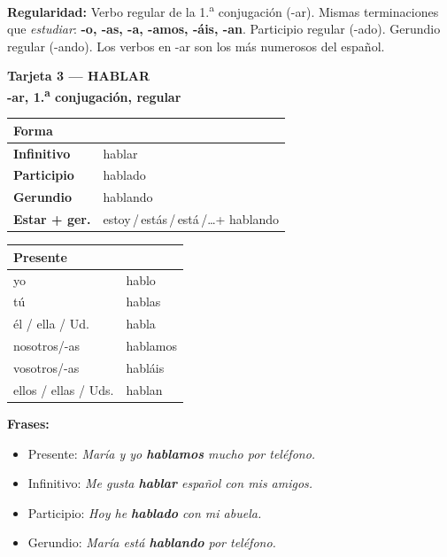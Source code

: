 \documentclass[a4paper,10pt]{article}
\newcommand{\verboheader}[3]{%
  \noindent
  \colorbox{azulverbo!90}{\parbox{\dimexpr\linewidth-2\fboxsep}{%
    \centering\color{white}\bfseries\large Tarjeta #1 --- #2\\[2pt]
    \normalsize #3%
  }}
  \vspace{4pt}
}
\begin{document}
\begin{trucoverbo}
\textbf{Regularidad:} Verbo regular de la 1.\textsuperscript{a} conjugación (-ar). Mismas terminaciones que \textit{estudiar}: \textbf{-o, -as, -a, -amos, -áis, -an}. Participio regular (-ado). Gerundio regular (-ando). Los verbos en -ar son los más numerosos del español.
\end{trucoverbo}

\newpage

\verboheader{3}{HABLAR}{-ar, 1.\textsuperscript{a} conjugación, regular}

\begin{minipage}[t]{0.48\linewidth}
\small
\begin{tabular}{|>{\bfseries}l|l|}
\hline
\rowcolor{azulverbo!15} Forma & \\
\hline
Infinitivo & hablar \\
\hline
\rowcolor{grisclaro}
Participio & hablado \\
\hline
Gerundio & hablando \\
\hline
\rowcolor{grisclaro}
Estar + ger. & estoy\,/\,estás\,/\,está\,/\ldots\;+ hablando \\
\hline
\end{tabular}
\end{minipage}
\hfill
\begin{minipage}[t]{0.48\linewidth}
\small
\begin{tabular}{|l|l|}
\hline
\rowcolor{azulverbo!15} \textbf{Presente} & \\
\hline
yo & hablo \\
\hline
\rowcolor{grisclaro}
tú & hablas \\
\hline
él / ella / Ud. & habla \\
\hline
\rowcolor{grisclaro}
nosotros/-as & hablamos \\
\hline
vosotros/-as & habláis \\
\hline
\rowcolor{grisclaro}
ellos / ellas / Uds. & hablan \\
\hline
\end{tabular}
\end{minipage}

\vspace{4pt}
\small
\textbf{Frases:}
\begin{itemize}[nosep, leftmargin=1em]
\item Presente: \textit{María y yo \textbf{hablamos} mucho por teléfono.}
\item Infinitivo: \textit{Me gusta \textbf{hablar} español con mis amigos.}
\item Participio: \textit{Hoy he \textbf{hablado} con mi abuela.}
\item Gerundio: \textit{María está \textbf{hablando} por teléfono.}
\end{itemize}
\end{document}
